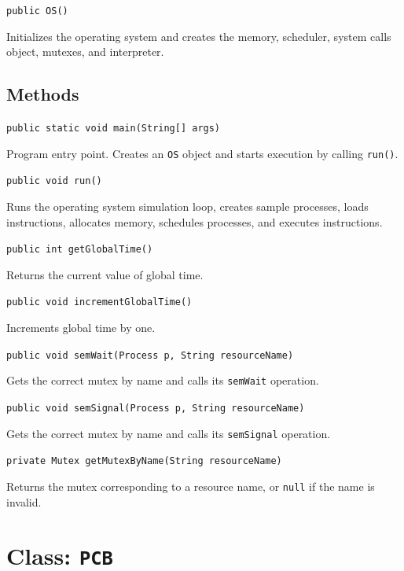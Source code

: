 \documentclass[12pt,a4paper]{article}
\begin{document}
\begin{signaturebox}
\texttt{public OS()}
\end{signaturebox}

Initializes the operating system and creates the memory, scheduler, system calls object, mutexes, and interpreter.

\subsection{Methods}

\begin{signaturebox}
\texttt{public static void main(String[] args)}
\end{signaturebox}
Program entry point. Creates an \texttt{OS} object and starts execution by calling \texttt{run()}.

\begin{signaturebox}
\texttt{public void run()}
\end{signaturebox}
Runs the operating system simulation loop, creates sample processes, loads instructions, allocates memory, schedules processes, and executes instructions.

\begin{signaturebox}
\texttt{public int getGlobalTime()}
\end{signaturebox}
Returns the current value of global time.

\begin{signaturebox}
\texttt{public void incrementGlobalTime()}
\end{signaturebox}
Increments global time by one.

\begin{signaturebox}
\texttt{public void semWait(Process p, String resourceName)}
\end{signaturebox}
Gets the correct mutex by name and calls its \texttt{semWait} operation.

\begin{signaturebox}
\texttt{public void semSignal(Process p, String resourceName)}
\end{signaturebox}
Gets the correct mutex by name and calls its \texttt{semSignal} operation.

\begin{signaturebox}
\texttt{private Mutex getMutexByName(String resourceName)}
\end{signaturebox}
Returns the mutex corresponding to a resource name, or \texttt{null} if the name is invalid.

\section{Class: \texttt{PCB}}
\end{document}
